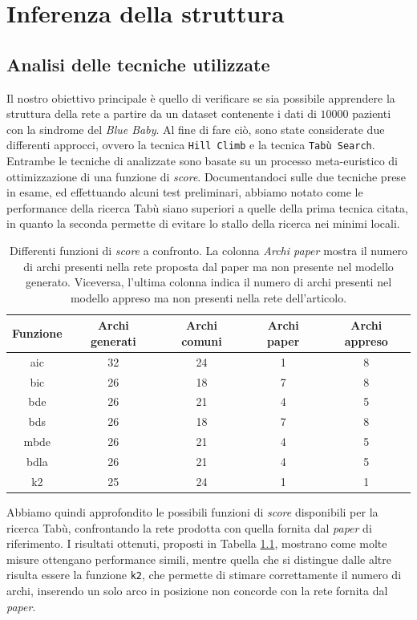 \chapter{Inferenza della struttura}
\section{Analisi delle tecniche utilizzate}
\label{sec:misure}
Il nostro obiettivo principale è quello di verificare se sia possibile apprendere la struttura della rete a partire da un dataset contenente i dati di $10000$ pazienti con la sindrome del \textit{Blue Baby}. Al fine di fare ciò, sono state considerate due differenti approcci, ovvero la tecnica \texttt{Hill Climb} e la tecnica \texttt{Tabù Search}. Entrambe le tecniche di analizzate sono basate su un processo meta-euristico di ottimizzazione di una funzione di \textit{score}. Documentandoci sulle due tecniche prese in esame, ed effettuando alcuni test preliminari, abbiamo notato come le performance della ricerca Tabù siano superiori a quelle della prima tecnica citata, in quanto la seconda permette di evitare lo stallo della ricerca nei minimi locali.\\
\begin{table}[t!]
	\centering
	\caption{Differenti funzioni di \textit{score} a confronto. La colonna \textit{Archi paper} mostra il numero di archi presenti nella rete proposta dal paper ma non presente nel modello generato. Viceversa, l'ultima colonna indica il numero di archi presenti nel modello appreso ma non presenti nella rete dell'articolo.}
	\begin{tabular}{|c|c|c|c|c|}
		\hline 
		Funzione & Archi generati  & Archi comuni & Archi paper & Archi appreso \\ 
		\hline 
		aic & 32 & 24 & 1 & 8 \\ 
		\hline 
		bic & 26 & 18 & 7 & 8 \\ 
		\hline 
		bde & 26 & 21 & 4 & 5 \\ 
		\hline 
		bds & 26 & 18 & 7 & 8 \\ 
		\hline 
		mbde & 26 & 21 & 4 & 5 \\ 
		\hline 
		bdla & 26 & 21 & 4 & 5 \\ 
		\hline 
		k2 & 25 & 24 & 1 & 1 \\ 
		\hline 
	\end{tabular} 
	\label{tab:score}
\end{table}
Abbiamo quindi approfondito le possibili funzioni di \textit{score} disponibili per la ricerca Tabù, confrontando la rete prodotta con quella fornita dal \textit{paper} di riferimento. I risultati ottenuti, proposti in Tabella \ref{tab:score}, mostrano come molte misure ottengano performance simili, mentre quella che si distingue dalle altre risulta essere la funzione \texttt{k2}, che permette di stimare correttamente il numero di archi, inserendo un solo arco in posizione non concorde con la rete fornita dal \textit{paper}.

